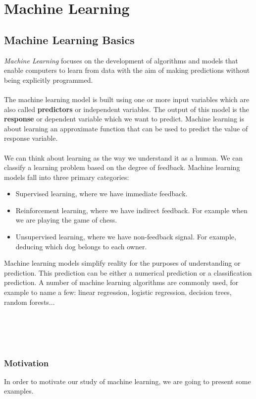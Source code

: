 \documentclass[../main.tex]{subfiles}
\begin{document}
	\chapter{Machine Learning} \label{ch:machine}
	

	\section{Machine Learning Basics}
	\noindent 
	
	\noindent  \textit{Machine Learning} focuses on the development of algorithms and models that enable computers to learn from data with the aim of making predictions without being explicitly programmed. \\ \\ 
	The machine learning model is built using one or more input variables which are also called \textbf{predictors} or independent variables. The output of this model is the \textbf{response} or dependent variable which we want to predict. Machine learning is about learning an approximate function that can be used to predict the value of response variable.\\ \\
	We can think about learning as the way we understand it as a human. We can classify a learning problem based on the degree of feedback. Machine learning models fall into three primary categories:
	\begin{itemize}
		\item Supervised learning, where we have immediate feedback.
		\item Reinforcement learning, where we have indirect feedback. For example when we are playing the game of chess.
		\item Unsupervised learning, where we have non-feedback signal. For example, deducing which dog belongs to each owner.
	\end{itemize}
	Machine learning models simplify reality for the purposes of understanding or prediction. This prediction can be either a numerical prediction or a classification prediction. A number of machine learning algorithms are commonly used, for example to name a few: linear regression, logistic regression, decision trees, random forests...
	\\ \\ \\ \\ \\ 
	
	\subsection{Motivation }
	\noindent In order to motivate our study of machine learning, we are going to present some examples.  
	
\end{document}
